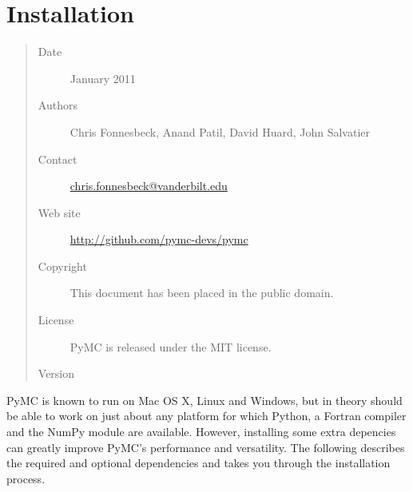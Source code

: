 \documentclass[letterpaper,10pt,english]{sphinxmanual}
\begin{document}
\chapter{Installation}
\label{INSTALL:testimonials}\label{INSTALL:installation}\label{INSTALL::doc}\begin{quote}\begin{description}
\item[{Date}]  January 2011

\item[{Authors}] \leavevmode
Chris Fonnesbeck, Anand Patil, David Huard, John Salvatier

\item[{Contact}] \leavevmode
\href{mailto:chris.fonnesbeck@vanderbilt.edu}{chris.fonnesbeck@vanderbilt.edu}

\item[{Web site}] \leavevmode
\href{http://github.com/pymc-devs/pymc}{http://github.com/pymc-devs/pymc}

\item[{Copyright}] \leavevmode
This document has been placed in the public domain.

\item[{License}] \leavevmode
PyMC is released under the MIT license.

\item[{Version}] 

\end{description}\end{quote}

PyMC is known to run on Mac OS X, Linux and Windows, but in theory should be
able to work on just about any platform for which Python, a Fortran compiler
and the NumPy module are  available. However, installing some extra
depencies can greatly improve PyMC's performance and versatility.
The following describes the required and optional dependencies and takes you
through the installation process.
\end{document}
